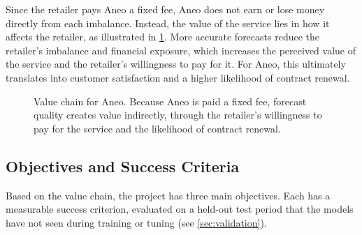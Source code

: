 \documentclass[11pt,a4paper]{article}
\begin{document}
Since the retailer pays Aneo a fixed fee, Aneo does not earn or lose money directly from each imbalance. Instead, the value of the service lies in how it affects the retailer, as illustrated in \cref{fig:value-chain}. More accurate forecasts reduce the retailer's imbalance and financial exposure, which increases the perceived value of the service and the retailer's willingness to pay for it. For Aneo, this ultimately translates into customer satisfaction and a higher likelihood of contract renewal.

\begin{figure}[H]
\centering
{}
\caption{Value chain for Aneo. Because Aneo is paid a fixed fee, forecast quality creates value indirectly, through the retailer's willingness to pay for the service and the likelihood of contract renewal.}
\label{fig:value-chain}
\end{figure}
\vspace{-0.5cm}
\subsection{Objectives and Success Criteria}
\label{sec:success}

Based on the value chain, the project has three main objectives. Each has a measurable success criterion, evaluated on a held-out test period that the models have not seen during training or tuning (see \cref{sec:validation}).
\end{document}
